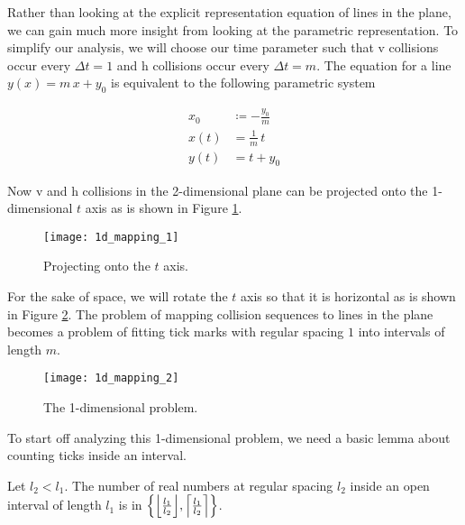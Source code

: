 
Rather than looking at the explicit representation equation of lines in the plane, we can gain much more insight from looking at the parametric representation. To simplify our analysis, we will choose our time parameter such that v collisions occur every $\Delta t = 1$ and h collisions occur every $\Delta t = m$. The equation for a line $y(x) = m \, x + y_0$ is equivalent to the following parametric system

\begin{align}\label{eq:parametric-line}
	x_0& \coloneqq - \frac{y_0}{m}\\
	x(t)& = \frac{1}{m} \, t\\
	y(t)& = t + y_0
\end{align}

Now v and h collisions in the 2-dimensional plane can be projected onto the 1-dimensional $t$ axis as is shown in Figure \ref{fig:1d-projection}. 

\begin{figure}[H]
  \begin{center}
    \texttt{[image: 1d\_mapping\_1]}
  \end{center}
  \vspace{-.2in} %
  \caption{\label{fig:1d-projection} Projecting onto the $t$ axis.}
\end{figure}

For the sake of space, we will rotate the $t$ axis so that it is horizontal as is shown in Figure \ref{fig:1d-problem}. The problem of mapping collision sequences to lines in the plane becomes a problem of fitting tick marks with regular spacing $1$ into intervals of length $m$.

\begin{figure}[H]
  \begin{center}
    \texttt{[image: 1d\_mapping\_2]}
  \end{center}
  \vspace{-.2in} %
  \caption{\label{fig:1d-problem} The 1-dimensional problem.}
\end{figure}


To start off analyzing this 1-dimensional problem, we need a basic lemma about counting ticks inside an interval.

\begin{lemma}\label{lem:interval-ticks}
	Let $l_2 < l_1$. The number of real numbers at regular spacing $l_2$ inside an open interval of length $l_1$ is in $\cbracket{\floor{\frac{l_1}{l_2}}, \ceil{\frac{l_1}{l_2}}}$.
\end{lemma}

